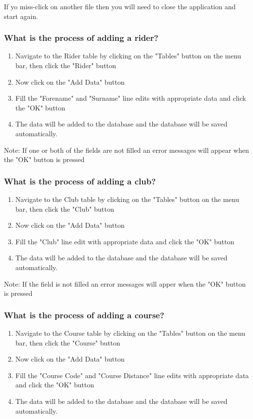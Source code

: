 If yo miss-click on another file then you will need to close the application and start again.

\subsubsection{What is the process of adding a rider?}
\begin{enumerate}
\item Navigate to the Rider table by clicking on the "Tables" button on the menu bar, then click the "Rider" button
\item Now click on the "Add Data" button
\item Fill the "Forename" and "Surname" line edits with appropriate data and click the "OK" button
\item The data will be added to the database and the database will be saved automatically.
\end{enumerate}

Note: If one or both of the fields are not filled an error messages will appear when the "OK" button is pressed

\subsubsection{What is the process of adding a club?}
\begin{enumerate}
\item Navigate to the Club table by clicking on the "Tables" button on the menu bar, then click the "Club" button
\item Now click on the "Add Data" button
\item Fill the "Club" line edit with appropriate data and click the "OK" button
\item The data will be added to the database and the database will be saved automatically.
\end{enumerate}

Note: If  the field is not filled an error messages will apper when the "OK" button is pressed

\subsubsection{What is the process of adding a course?}
\begin{enumerate}
\item Navigate to the Course table by clicking on the "Tables" button on the menu bar, then click the "Course" button
\item Now click on the "Add Data" button
\item Fill the "Course Code" and "Course Distance" line edits with appropriate data and click the "OK" button
\item The data will be added to the database and the database will be saved automatically.
\end{enumerate}

